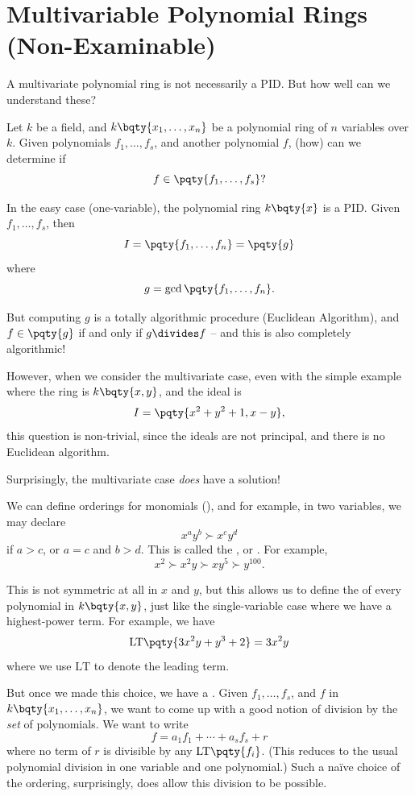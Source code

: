 \section{Multivariable Polynomial Rings (Non-Examinable)}

A multivariate polynomial ring is not necessarily a PID. But how well can we understand these?

Let \(k\) be a field, and \(k\bqty{x_1, \ldots, x_n}\) be a polynomial ring of \(n\) variables over \(k\). Given polynomials \(f_1, \ldots, f_s\), and another polynomial \(f\), (how) can we determine if
\[
    f \in \pqty{f_1, \ldots, f_s}?
\]

In the easy case (one-variable), the polynomial ring \(k\bqty{x}\) is a PID. Given \(f_1, \ldots, f_s\), then
\[
    I = \pqty{f_1, \ldots, f_n} = \pqty{g}
\]
where
\[
    g = \gcd\pqty{f_1, \ldots, f_n}.
\]

But computing \(g\) is a totally algorithmic procedure (Euclidean Algorithm), and \(f \in \pqty{g}\) if and only if \(g \divides f\) -- and this is also completely algorithmic!

However, when we consider the multivariate case, even with the simple example where the ring is \(k\bqty{x, y}\), and the ideal is
\[
    I = \pqty{x^2 + y^2 + 1, x - y},
\]
this question is non-trivial, since the ideals are not principal, and there is no Euclidean algorithm.

Surprisingly, the multivariate case \emph{does} have a solution!

We can define orderings for monomials (), and for example, in two variables, we may declare
\[
    x^a y^b \succ x^c y^d
\]
if \(a > c\), or \(a = c\) and \(b > d\). This is called the , or . For example,
\[
    x^2 \succ x^2 y \succ x y^5 \succ y^{100}.
\]

This is not symmetric at all in \(x\) and \(y\), but this allows us to define the  of every polynomial in \(k\bqty{x, y}\), just like the single-variable case where we have a highest-power term. For example, we have
\[
    \text{LT}\pqty{3x^2 y + y^3 + 2} = 3x^2 y
\]
where we use \(\text{LT}\) to denote the leading term.

But once we made this choice, we have a . Given \(f_1, \ldots, f_s\), and \(f\) in \(k\bqty{x_1, \ldots, x_n}\), we want to come up with a good notion of division by the \emph{set} of polynomials. We want to write
\[
    f = a_1 f_1 + \cdots + a_s f_s + r
\]
where no term of \(r\) is divisible by any \(\text{LT} \pqty{f_i}\). (This reduces to the usual polynomial division in one variable and one polynomial.) Such a na\"{i}ve choice of the ordering, surprisingly, does allow this division to be possible.

